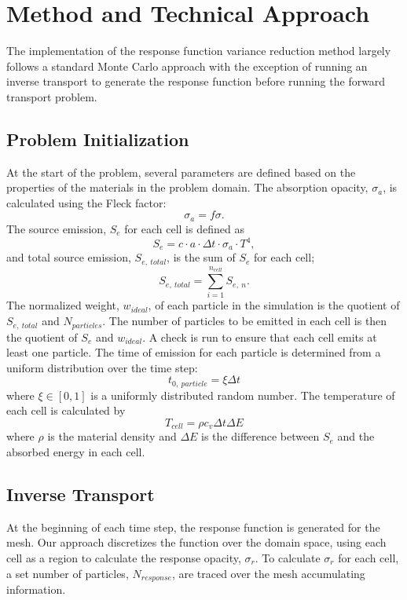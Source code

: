\documentclass[]{article}
\begin{document}
\section{Method and Technical Approach}
	The implementation of the response function variance reduction method largely follows a standard Monte Carlo approach with the exception of running an inverse transport to generate the response function before running the forward transport problem. 

	\subsection{Problem Initialization}	
		At the start of the problem, several parameters are defined based on the properties of the materials in the problem domain. The absorption opacity, $\sigma_{a}$, is calculated using the Fleck factor:
		\begin{equation}
		\sigma_{a} = f \sigma.
		\end{equation}The source emission, $S_{e}$ for each cell is defined as
		\begin{equation}
			S_{e} = c \cdot a \cdot \Delta t \cdot \sigma_{a}  \cdot T^{4},
		\end{equation}
		and total source emission, $S_{e,~total}$, is the sum of $S_{e}$ for each cell;
		\begin{equation}
			S_{e,~total} = \sum_{i = 1}^{n_{cell}} S_{e,~n}.
		\end{equation}
		The normalized weight, $w_{ideal}$, of each particle in the simulation is the quotient of $S_{e,~total}$ and $N_{particles}$. The number of particles to be emitted in each cell is then the quotient of $S_{e}$ and $w_{ideal}$. A check is run to ensure that each cell emits at least one particle. The time of emission for each particle is determined from a uniform distribution over the time step:
		\begin{equation}
			t_{0,~particle} = \xi \Delta t
		\end{equation}
		where $\xi \in [0,1]$ is a uniformly distributed random number. The temperature of each cell is calculated by
		\begin{equation} \label{Eq: cell_T}
			T_{cell} = \rho c_{v} \Delta t \Delta E
		\end{equation}
		where $\rho$ is the material density and $\Delta E$ is the difference between $S_{e}$ and the absorbed energy in each cell.

	\subsection{Inverse Transport}
		At the beginning of each time step, the response function is generated for the mesh. Our approach discretizes the function over the domain space, using each cell as a region to calculate the response opacity, $\sigma_{r}$. To calculate $\sigma_{r}$ for each cell, a set number of particles, $N_{response}$, are traced over the mesh accumulating information. 
		
\end{document}
